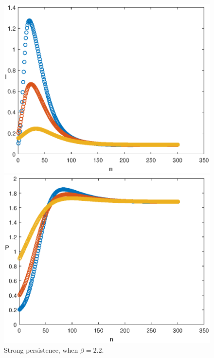 \documentclass[reqno]{amsart}
\begin{document}
{{\begin{figure}
\begin{minipage}[b]{.32\linewidth}
  \end{minipage}
  \begin{minipage}[b]{.32\linewidth}
        \includegraphics[width=\linewidth]{Infected_PERS_AUT.eps}
  \end{minipage}
  \begin{minipage}[b]{.32\linewidth}
        \includegraphics[width=\linewidth]{Predator_PERS_AUT.eps}
  \end{minipage}
    \caption{Strong persistence, when $\beta=2.2$.}
      \label{fig-no-autonomous-PER-1}
\end{figure}


}}
\end{document}

